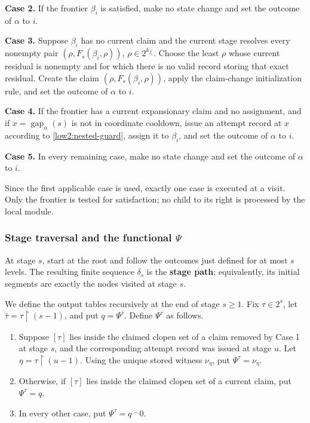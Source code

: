 \documentclass[11pt]{amsart}
\begin{document}
\medskip
\noindent\textbf{Case 2.}
If the frontier $\beta_i$ is satisfied, make no state change and set the
outcome of $\alpha$ to $i$.

\medskip
\noindent\textbf{Case 3.}
Suppose $\beta_i$ has no current claim and the current stage resolves every
nonempty pair
$(\rho,F_s(\beta_i,\rho))$, $\rho\in2^{k_{\beta_i}}$. Choose the least
$\rho$ whose current residual is nonempty and for which there is no valid
record storing that exact residual. Create the claim
$(\rho,F_s(\beta_i,\rho))$, apply the claim-change initialization rule, and
set the outcome of $\alpha$ to $i$.

\medskip
\noindent\textbf{Case 4.}
If the frontier has a current expansionary claim and no assignment, and if
$x=\operatorname{gap}_\alpha(s)$ is not in
coordinate cooldown, issue an attempt record at $x$ according to
\eqref{low2:nested-guard}, assign it to $\beta_i$, and set the outcome of
$\alpha$ to $i$.

\medskip
\noindent\textbf{Case 5.}
In every remaining case, make no state change and set the outcome of $\alpha$
to $i$.

\medskip
Since the first applicable case is used, exactly one case is executed at a
visit. Only the frontier is tested for satisfaction; no child to its right is
processed by the local module.

\subsubsection{Stage traversal and the functional $\Psi$}

At stage $s$, start at the root and follow the outcomes just defined for at
most $s$ levels. The resulting finite sequence $\delta_s$ is the
\textbf{stage path}; equivalently, its initial segments are exactly the nodes
visited at stage $s$.

We define the output tables recursively at the end of stage $s\geq1$. Fix
$\tau\in2^s$, let $\bar\tau=\tau\upharpoonright(s-1)$, and put
$q=\Psi^{\bar\tau}$. Define $\Psi^\tau$ as follows.
\begin{enumerate}[label=(\roman*)]
\item Suppose $[\tau]$ lies inside the claimed clopen set of a claim removed
      by Case 1 at stage $s$, and the corresponding attempt record was issued
      at stage $u$. Let $\eta=\tau\upharpoonright(u-1)$. Using the unique
      stored witness $\nu_\eta$, put $\Psi^\tau=\nu_\eta$.
\item Otherwise, if $[\tau]$ lies inside the claimed clopen set of a current
      claim, put $\Psi^\tau=q$.
\item In every other case, put $\Psi^\tau=q\,^{\smallfrown}0$.
\end{enumerate}
\end{document}

